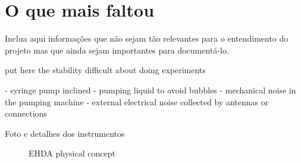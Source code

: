 \chapter{O que mais faltou}

Inclua aqui informações que não sejam tão relevantes para o entendimento do projeto mas que ainda sejam importantes para documentá-lo. 


put here the stability difficult about doing experiments

- syringe pump inclined
- pumping liquid to avoid bubbles
- mechanical noise in the pumping machine
- external electrical noise collected by antennas or connections

Foto e detalhes dos instrumentos

\begin{figure}[H]
    \centering
    \caption{EHDA physical concept }
\end{figure}


